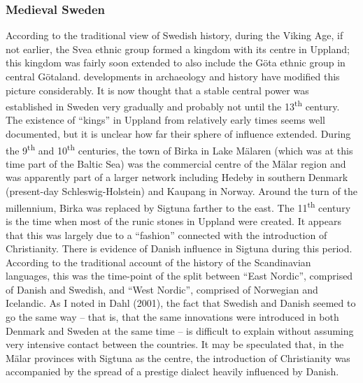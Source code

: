 \subsubsection[Medieval Sweden]{\rmfamily Medieval Sweden}
According to the traditional view of Swedish history, during the Viking Age, if not earlier, the Svea ethnic group formed a kingdom with its centre in Uppland; this kingdom was fairly soon extended to also include the Göta ethnic group in central Götaland. developments in archaeology and history have modified this picture considerably. It is now thought that a stable central power was established in Sweden very gradually and probably not until the 13\textsuperscript{th} century. The existence of “kings” in Uppland from relatively early times seems well documented, but it is unclear how far their sphere of influence extended. During the 9\textsuperscript{th} and 10\textsuperscript{th} centuries, the town of Birka in Lake Mälaren (which was at this time part of the Baltic Sea) was the commercial centre of the Mälar region and was apparently part of a larger network including Hedeby in southern Denmark (present-day Schleswig-Holstein) and Kaupang in Norway. Around the turn of the millennium, Birka was replaced by Sigtuna farther to the east. The 11\textsuperscript{th} century is the time when most of the runic stones in Uppland were created. It appears that this was largely due to a “fashion” connected with the introduction of Christianity. There is evidence of Danish influence in Sigtuna during this period. According to the traditional account of the history of the Scandinavian languages, this was the time-point of the split between “East Nordic”, comprised of Danish and Swedish, and “West Nordic”, comprised of Norwegian and Icelandic. As I noted in Dahl (2001), the fact that Swedish and Danish seemed to go the same way – that is, that the same innovations were introduced in both Denmark and Sweden at the same time – is difficult to explain without assuming very intensive contact between the countries. It may be speculated that, in the Mälar provinces with Sigtuna as the centre, the introduction of Christianity was accompanied by the spread of a prestige dialect heavily influenced by Danish. 

